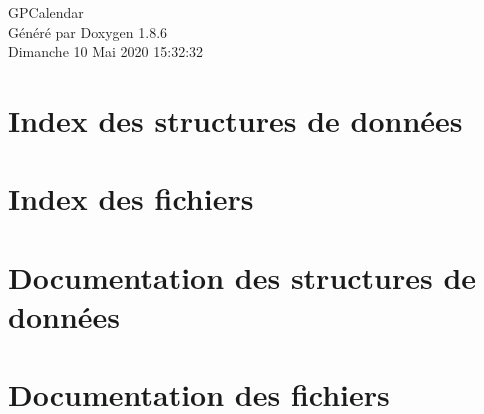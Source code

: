 \documentclass[twoside]{book}
\newcommand{\clearemptydoublepage}{%
  \newpage{\pagestyle{empty}\cleardoublepage}%
}
\begin{document}
\hypersetup{pageanchor=false}
\begin{titlepage}
\vspace*{7cm}
\begin{center}%
{\Large G\-P\-Calendar }\\
\vspace*{1cm}
{\large Généré par Doxygen 1.8.6}\\
\vspace*{0.5cm}
{\small Dimanche 10 Mai 2020 15:32:32}\\
\end{center}
\end{titlepage}
\clearemptydoublepage
\tableofcontents
\clearemptydoublepage
{}
\hypersetup{pageanchor=true}

\chapter{Index des structures de données}

\chapter{Index des fichiers}

\chapter{Documentation des structures de données}


























\chapter{Documentation des fichiers}




























\newpage
{}
{}
\printindex
\end{document}
